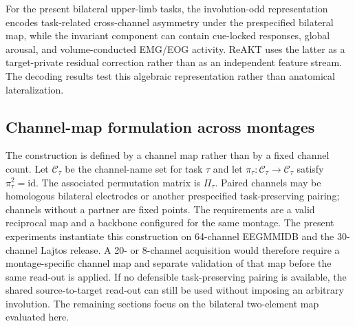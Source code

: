 \documentclass[preprint,12pt]{elsarticle}
\newcommand{\method}{ReAKT}
\begin{document}
For the present bilateral upper-limb tasks, the involution-odd representation encodes task-related cross-channel asymmetry under the prespecified bilateral map, while the invariant component can contain cue-locked responses, global arousal, and volume-conducted EMG/EOG activity. \method{} uses the latter as a target-private residual correction rather than as an independent feature stream. The decoding results test this algebraic representation rather than anatomical lateralization.

\subsection{Channel-map formulation across montages}
The construction is defined by a channel map rather than by a fixed channel count. Let
$\mathcal{C}_{\tau}$ be the channel-name set for task $\tau$ and let
$\pi_{\tau}:\mathcal{C}_{\tau}\to\mathcal{C}_{\tau}$ satisfy
$\pi_{\tau}^{2}=\mathrm{id}$. The associated permutation matrix is
$\Pi_{\tau}$. Paired channels may be homologous bilateral electrodes or another
prespecified task-preserving pairing; channels without a partner are fixed
points. The requirements are a valid reciprocal map and a backbone configured
for the same montage. The present experiments instantiate this construction on
64-channel EEGMMIDB and the 30-channel Lajtos release. A 20- or 8-channel
acquisition would therefore require a montage-specific channel map and
separate validation of that map before the same read-out is applied. If no
defensible task-preserving pairing is available, the shared source-to-target
read-out can still be used without imposing an arbitrary involution. The
remaining sections focus on the bilateral two-element map evaluated here.
\end{document}

